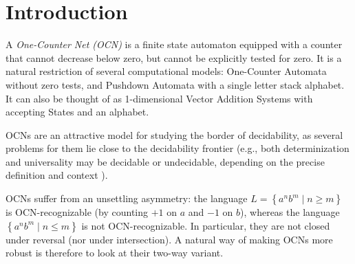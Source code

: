 \documentclass[USenglish]{lipics-v2021}
\begin{document}
	\section{Introduction}
	A \emph{One-Counter Net (OCN)} is a finite state automaton equipped with a
	counter that cannot decrease below zero, but cannot be explicitly tested for
	zero.  It is a natural restriction of several computational models: One-Counter
	Automata without zero tests, and Pushdown
	Automata with a single letter stack alphabet. It can also be thought of as
	1-dimensional Vector Addition Systems with accepting States and an alphabet.
	
	OCNs are an attractive model for studying the border of decidability, as several
	problems for them lie close to the decidability frontier (e.g., both
	determinization and universality may be decidable or undecidable, depending on
	the precise definition and context
	\cite{hofman2013decidability,hofman2014trace,almagor2020parametrized,almagor2022determinization,almagor2024dimension}).
	
	OCNs suffer from an unsettling asymmetry: the language
	$L=\left\{a^nb^m \mid n \geq m\right\}$ is OCN-recognizable (by counting $+1$ on
	$a$ and $-1$ on $b$), whereas the language $\left\{a^nb^m \mid n \leq m\right\}$ is
	not OCN-recognizable. In particular, they are not closed under reversal (nor
	under intersection).  A natural way of making OCNs more robust is therefore to
	look at their two-way variant. 
	
\end{document}
